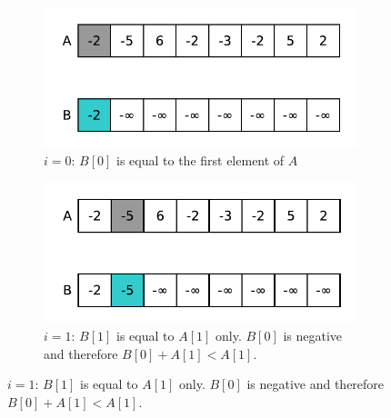 \begin{figure}
	\centering
	\begin{subfigure}[t]{0.48\textwidth}
		\centering
		\includegraphics[width=\textwidth]{sources/max_sum_continguous_subarray/images/kadane1}
		\caption{$i=0$: $B[0]$ is equal to the first element of $A$}
		\label{fig:median_sorted_array:kadane0}
	\end{subfigure}
	\hfill
	\begin{subfigure}[t]{0.48\textwidth}
		\centering
		\includegraphics[width=\textwidth]{sources/max_sum_continguous_subarray/images/kadane2}
		\caption{$i=1$: $B[1]$ is equal to $A[1]$ only. $B[0]$ is negative and therefore $B[0]+A[1] < A[1]$.}
		\label{fig:median_sorted_array:kadane1}
	\end{subfigure}
	\hfill


\end{figure}
